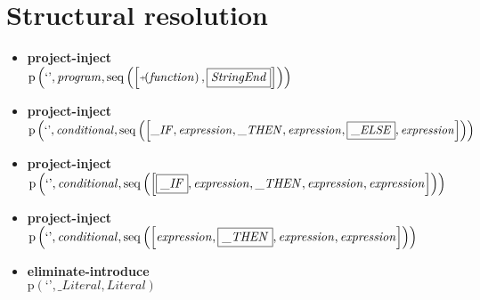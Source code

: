\section{Structural resolution}
{\footnotesize\begin{itemize}
\item \textbf{project-inject}\\$\mathrm{p}\left(\text{`'},\mathit{program},\mathrm{seq}\left(\left[\plus \left(\mathit{function}\right), \fbox{$\mathit{StringEnd}$}\right]\right)\right)$
\item \textbf{project-inject}\\$\mathrm{p}\left(\text{`'},\mathit{conditional},\mathrm{seq}\left(\left[\mathit{\_ IF}, \mathit{expression}, \mathit{\_ THEN}, \mathit{expression}, \fbox{$\mathit{\_ ELSE}$}, \mathit{expression}\right]\right)\right)$
\item \textbf{project-inject}\\$\mathrm{p}\left(\text{`'},\mathit{conditional},\mathrm{seq}\left(\left[\fbox{$\mathit{\_ IF}$}, \mathit{expression}, \mathit{\_ THEN}, \mathit{expression}, \mathit{expression}\right]\right)\right)$
\item \textbf{project-inject}\\$\mathrm{p}\left(\text{`'},\mathit{conditional},\mathrm{seq}\left(\left[\mathit{expression}, \fbox{$\mathit{\_ THEN}$}, \mathit{expression}, \mathit{expression}\right]\right)\right)$
\item \textbf{eliminate-introduce}\\$\mathrm{p}\left(\text{`'},\mathit{\_ Literal},\mathit{Literal}\right)$
\end{itemize}}
